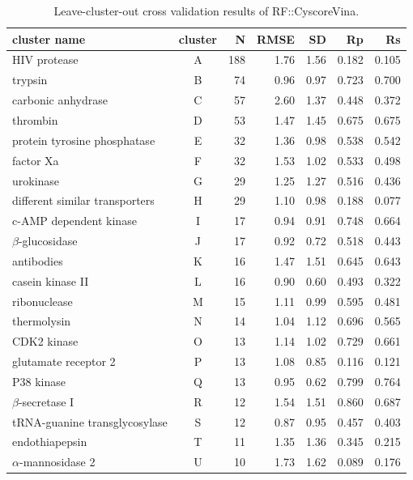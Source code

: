 \begin{table}
\caption{Leave-cluster-out cross validation results of RF::CyscoreVina.}
\label{rfcyscore:lcocv3}
\begin{tabular}{lcrrrrr}
\hline
cluster name & cluster & N & RMSE & SD & Rp & Rs\\
\hline
HIV protease                   & A & 188 & 1.76 & 1.56 & 0.182 & 0.105\\
trypsin                        & B &  74 & 0.96 & 0.97 & 0.723 & 0.700\\
carbonic anhydrase             & C &  57 & 2.60 & 1.37 & 0.448 & 0.372\\
thrombin                       & D &  53 & 1.47 & 1.45 & 0.675 & 0.675\\
protein tyrosine phosphatase   & E &  32 & 1.36 & 0.98 & 0.538 & 0.542\\
factor Xa                      & F &  32 & 1.53 & 1.02 & 0.533 & 0.498\\
urokinase                      & G &  29 & 1.25 & 1.27 & 0.516 & 0.436\\
different similar transporters & H &  29 & 1.10 & 0.98 & 0.188 & 0.077\\
c-AMP dependent kinase         & I &  17 & 0.94 & 0.91 & 0.748 & 0.664\\
$\beta$-glucosidase            & J &  17 & 0.92 & 0.72 & 0.518 & 0.443\\
antibodies                     & K &  16 & 1.47 & 1.51 & 0.645 & 0.643\\
casein kinase II               & L &  16 & 0.90 & 0.60 & 0.493 & 0.322\\
ribonuclease                   & M &  15 & 1.11 & 0.99 & 0.595 & 0.481\\
thermolysin                    & N &  14 & 1.04 & 1.12 & 0.696 & 0.565\\
CDK2 kinase                    & O &  13 & 1.14 & 1.02 & 0.729 & 0.661\\
glutamate receptor 2           & P &  13 & 1.08 & 0.85 & 0.116 & 0.121\\
P38 kinase                     & Q &  13 & 0.95 & 0.62 & 0.799 & 0.764\\
$\beta$-secretase I            & R &  12 & 1.54 & 1.51 & 0.860 & 0.687\\
tRNA-guanine transglycosylase  & S &  12 & 0.87 & 0.95 & 0.457 & 0.403\\
endothiapepsin                 & T &  11 & 1.35 & 1.36 & 0.345 & 0.215\\
$\alpha$-mannosidase 2         & U &  10 & 1.73 & 1.62 & 0.089 & 0.176\\

\end{tabular}
\end{table}
